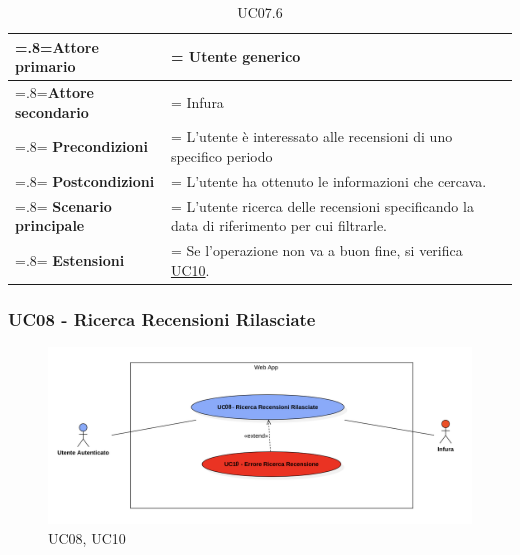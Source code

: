             \begin{table}[H]
                \centering
                \renewcommand{\arraystretch}{1.8}
                \renewcommand\tabularxcolumn[1]{m{#1}}
                \begin{tabularx}{0.9\textwidth} {
                    >{\hsize=.8\hsize\linewidth=\hsize}X
                    >{\hsize=1.2\hsize\linewidth=\hsize}X}
                    \hline
                    \textbf{Attore primario} & Utente generico \\
                    \hline
                    \textbf{Attore secondario} & Infura \\
                    \hline
                    \textbf{Precondizioni} & L'utente è interessato alle recensioni di uno specifico periodo \\
                    \hline
                    \textbf{Postcondizioni} & L'utente ha ottenuto le informazioni che cercava. \\
                    \hline
                    \textbf{Scenario principale} & L'utente ricerca delle recensioni specificando la data di riferimento per cui filtrarle.\\
                    \hline
                    \textbf{Estensioni} & Se l'operazione non va a buon fine, si verifica \hyperref[UC10]{UC10}. \\
                    \hline
                \end{tabularx}
                \caption{UC07.6}
            \end{table}

        \subsubsection{UC08 - Ricerca Recensioni Rilasciate}
        \label{UC08}

            \begin{figure}[H]
                \centering
                \includegraphics[scale=0.6]{src/img/UC08.png}
                \caption{UC08, UC10}
            \end{figure}

